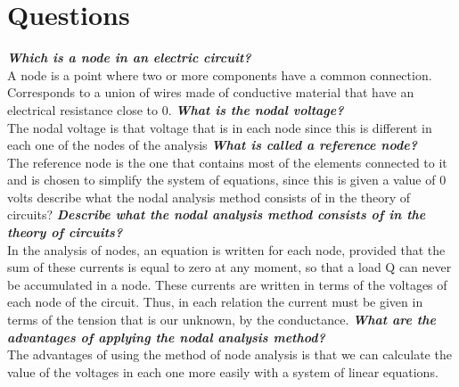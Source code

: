 \documentclass[letterpaper]{article}
\begin{document}
\section{Questions}
\textit{\textbf{Which is a node in an electric circuit?}}\\
A node is a point where two or more components have a common connection. Corresponds to a union of wires made of conductive material that have an electrical resistance close to 0.
\textit{\textbf{What is the nodal voltage?}}\\
The nodal voltage is that voltage that is in each node since this is different in each one of the nodes of the analysis
\textit{\textbf{What is called a reference node?}}\\
The reference node is the one that contains most of the elements connected to it and is chosen to simplify the system of equations, since this is given a value of 0 volts
describe what the nodal analysis method consists of in the theory of circuits?
\textit{\textbf{Describe what the nodal analysis method consists of in the theory of circuits?}}\\
In the analysis of nodes, an equation is written for each node, provided that the sum of these currents is equal to zero at any moment, so that a load Q can never be accumulated in a node. These currents are written in terms of the voltages of each node of the circuit. Thus, in each relation the current must be given in terms of the tension that is our unknown, by the conductance.
\textit{\textbf{What are the advantages of applying the nodal analysis method?}}\\
The advantages of using the method of node analysis is that we can calculate the value of the voltages in each one more easily with a system of linear equations.
\end{document}
